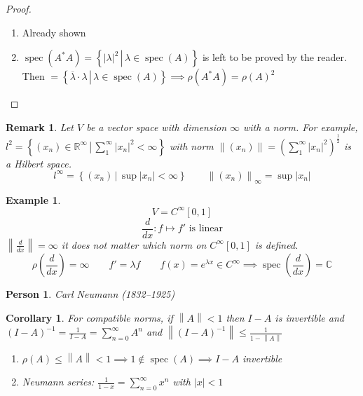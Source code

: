 \documentclass{article}
\newcounter{lecref}[section]
\numberwithin{lecref}{section}
\newtheorem{example}[lecref]{Example}
\newtheorem{remark}[lecref]{Remark}
\newtheorem{corollary}[lecref]{Corollary}
\newtheorem*{person}{Person}
\newcommand{\setdef}[2]{\left\{\left.#1\,\right|\,#2\right\}}
\newcommand{\norm}[1]{\left\|#1\right\|}
\newcommand{\card}[1]{\left|#1\right|}
\begin{document}
\begin{proof}
  \begin{enumerate}
    \item Already shown
    \item $\operatorname{spec}(A^* A) = \setdef{\card{\lambda}^2}{\lambda \in \operatorname{spec}(A)}$ is left to be proved by the reader. Then $= \setdef{\overline\lambda \cdot \lambda}{\lambda \in \operatorname{spec}(A)} \implies \rho(A^* A) = \rho(A)^2$
  \end{enumerate}
\end{proof}

\begin{remark} %
  Let $V$ be a vector space with dimension $\infty$ with a norm.
  For example, $l^2 = \setdef{(x_n) \in \mathbb R^\infty}{\sum_1^\infty \card{x_n}^2 < \infty}$
  with norm $\norm{(x_n)} = \left(\sum_1^\infty \card{x_n}^2\right)^{\frac12}$ is a \emph{Hilbert space}.
  \[ l^\infty = \setdef{(x_n)}{\sup\card{x_n} < \infty} \qquad \norm{(x_n)}_{\infty} = \sup\card{x_n} \]
\end{remark}

\begin{example}
  \[ V = C^{\infty}[0,1] \]
  \[ \frac d{dx}: f \mapsto f' \text{ is linear} \]
  $\norm{\frac{d}{dx}} = \infty$ it does not matter which norm on $C^{\infty}[0,1]$ is defined.
  \[ \rho(\frac d{dx}) = \infty \qquad f' = \lambda f \qquad f(x) = e^{\lambda x} \in C^\infty \implies \operatorname{spec}(\frac{d}{dx}) = \mathbb C \]
\end{example}

\begin{person}
  Carl Neumann (1832--1925)
\end{person}

\begin{corollary} %
  \label{cor1410}
  For compatible norms, if $\norm{A} < 1$ then $I - A$ is invertible and $(I - A)^{-1} = \frac{1}{I - A} = \sum_{n=0}^\infty A^n$ and $\norm{(I - A)^{-1}} \leq \frac{1}{1 - \norm{A}}$

  \begin{enumerate}
    \item $\rho(A) \leq \norm{A} < 1 \implies 1 \not\in \operatorname{spec}(A) \implies I - A$ invertible
    \item Neumann series: $\frac{1}{1 - x} = \sum_{n=0}^\infty x^n$ with $\card{x} < 1$
  \end{enumerate}
\end{corollary}
\end{document}
